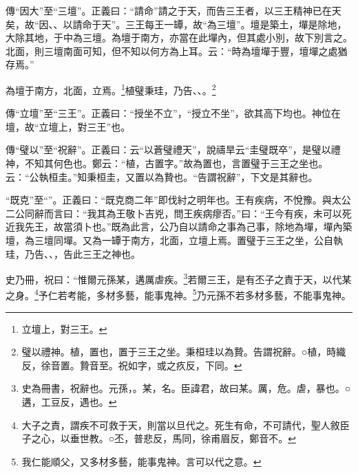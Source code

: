 {\noindent\zhuan{}\fzbyks 傳“因大”至“三壇”。正義曰：“請命”請之于天，而告三王者，以三王精神已在天矣，故“因、、以請命于天”。三王每王一罈，故“為三壇”。壇是築土，墠是除地，大除其地，于中為三壇。為壇于南方，亦當在此墠內，但其處小別，故下別言之。北面，則三壇南面可知，但不知以何方為上耳。云：“時為壇墠于豐，壇墠之處猶存焉。” \par}

為壇于南方，北面，立焉。\footnote{立壇上，對三王。}植璧秉珪，乃告、、。\footnote{璧以禮神。植，置也，置于三王之坐。秉桓珪以為贄。告謂祝辭。○植，時織反，徐音置。贄音至。祝如字，或之疚反，下同。}

{\noindent\zhuan{}\fzbyks 傳“立壇”至“三王”。正義曰：“授坐不立”，“授立不坐”，欲其高下均也。神位在壇，故“立壇上，對三王”也。 \par}

{\noindent\zhuan{}\fzbyks 傳“璧以”至“祝辭”。正義曰：云“以蒼璧禮天”，說禱旱云“圭璧既卒”，是璧以禮神，不知其何色也。鄭云：“植，古置字。”故為置也，言置璧于三王之坐也。云：“公執桓圭。”知秉桓圭，又置以為贄也。“告謂祝辭”，下文是其辭也。 \par}

{\noindent\shu{}\fzkt “既克”至“”。正義曰：“既克商二年”即伐紂之明年也。王有疾病，不悅豫。與太公二公同辭而言曰：“我其為王敬卜吉兇，問王疾病瘳否。”曰：“王今有疾，未可以死近我先王，故當須卜也。”既為此言，公乃自以請命之事為己事，除地為墠，墠內築壇，為三壇同墠。又為一罈于南方，北面，立壇上焉。置璧于三王之坐，公自執珪，乃告、、，告此三王之神也。 \par}

史乃冊，祝曰：“惟爾元孫某，遘厲虐疾。\footnote{史為冊書，祝辭也。元孫，。某，名。臣諱君，故曰某。厲，危。虐，暴也。○遘，工豆反，遇也。}若爾三王，是有丕子之責于天，以代某之身。\footnote{大子之責，謂疾不可救于天，則當以旦代之。死生有命，不可請代，聖人敘臣子之心，以垂世教。○丕，普悲反，馬同，徐甫眉反，鄭音不。}予仁若考能，多材多藝，能事鬼神。\footnote{我仁能順父，又多材多藝，能事鬼神。言可以代之意。}乃元孫不若多材多藝，不能事鬼神。


